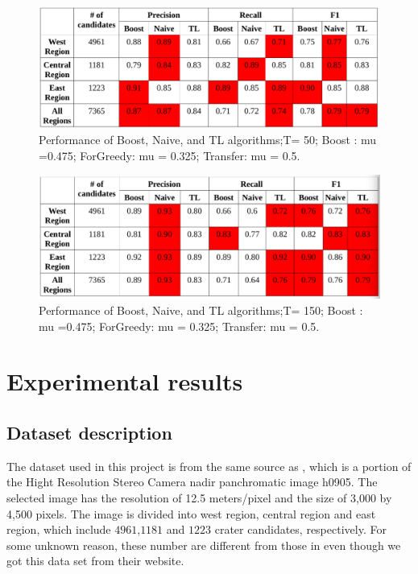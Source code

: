 \documentclass[conference]{IEEEtran}
\begin{document}
\begin{figure}[ht]
\begin{center}
\includegraphics[scale=0.45]{T_50.png}
\caption{Performance of Boost, Naive, and TL algorithms;T= 50; Boost : mu =0.475; ForGreedy: mu = 0.325; Transfer: mu = 0.5.}
\label{T50}
\end{center}
\end{figure}

\begin{figure}[ht]
\begin{center}
\includegraphics[scale=0.45]{T_150.png}
\caption{Performance of Boost, Naive, and TL algorithms;T= 150; Boost : mu =0.475; ForGreedy: mu = 0.325; Transfer: mu = 0.5.}
\label{T150}
\end{center}
\end{figure}

\section{Experimental results}
\subsection{Dataset description}

The dataset used in this project is from the same source as \cite{ding2011subkilometer}, which is a portion of the Hight Resolution Stereo Camera nadir panchromatic image h0905. The selected image has the resolution of 12.5 meters/pixel and the size of 3,000 by 4,500 pixels. The image is divided into west region, central region and east region, which include $4961$,$1181$ and $1223$ crater candidates, respectively. For some unknown reason, these number are different from those in \cite{ding2011subkilometer} even though we got this data set from their website.
\end{document}
